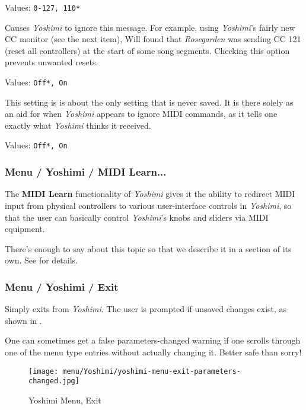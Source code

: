    Values: \texttt{0-127, 110*}

   Causes \textsl{Yoshimi} to ignore this message.
   For example, using \textsl{Yoshimi}'s fairly new CC monitor (see the next
   item), Will found that \textsl{Rosegarden} was sending CC 121 (reset all
   controllers) at the start of some song segments.  Checking this option
   prevents unwanted resets.

   Values: \texttt{Off*, On}

   This setting is is about the only setting that is never saved. It is there
   solely as an aid for when \textsl{Yoshimi} appears to ignore MIDI commands,
   as it tells one exactly what \textsl{Yoshimi} thinks it received.

   Values: \texttt{Off*, On}

\subsubsection{Menu / Yoshimi / MIDI Learn...}
\label{subsubsec:menu_yoshimi_midi_learn}

   The \textbf{MIDI Learn} functionality of \textsl{Yoshimi} gives it the
   ability to redirect MIDI input from physical controllers to various
   user-interface controls in \textsl{Yoshimi}, so that the user can basically
   control \textsl{Yoshimi}'s knobs and sliders via MIDI equipment.

   There's enough to say about this topic so that we describe it in a section
   of its own.
   See  for details.

\subsubsection{Menu / Yoshimi / Exit}
\label{subsubsec:menu_yoshimi_exit}

   Simply exits from \textsl{Yoshimi}.
   The user is prompted if unsaved changes exist, as shown in
   .

   One can sometimes get a false parameters-changed warning if one
   scrolls through one of the menu type entries without actually changing it.
   Better safe than sorry!

\begin{figure}[H]
   \centering 
   \texttt{[image: menu/Yoshimi/yoshimi-menu-exit-parameters-changed.jpg]}
   \caption[Yoshimi Menu, Exit]{Yoshimi Menu, Exit}
   \label{fig:yoshimi_change_exit}
\end{figure}

